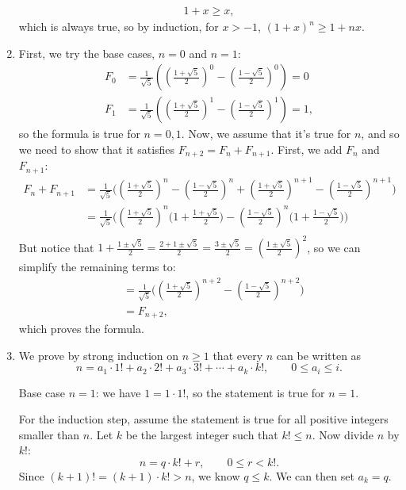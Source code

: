\documentclass[12pt]{article}
\begin{document}
\begin{enumerate}
\begin{align*}
        1+x \geq x,
    \end{align*}
    which is always true, so by induction, for $x > -1$, $(1+x)^n \geq 1 + nx$.
    \item First, we try the base cases, $n = 0$ and $n = 1$:
    \begin{align*}
        F_0 &= \frac{1}{\sqrt{5}} \left( \left( \frac{1 + \sqrt{5}}{2} \right)^0 - \left( \frac{1 - \sqrt{5}}{2} \right)^0 \right) = 0\\
        F_1 &= \frac{1}{\sqrt{5}} \left( \left( \frac{1 + \sqrt{5}}{2} \right)^1 - \left( \frac{1 - \sqrt{5}}{2} \right)^1 \right) = 1,
    \end{align*}
    so the formula is true for $n=0,1$. Now, we assume that it's true for $n$, and 
    so we need to show that it satisfies $F_{n+2} = F_n + F_{n+1}$. First, we add 
    $F_n$ and $F_{n+1}$:
    \begin{align*}
        F_n + F_{n+1}
        &= \frac{1}{\sqrt{5}}\Bigg(
        \left(\frac{1+\sqrt{5}}{2}\right)^n - \left(\frac{1-\sqrt{5}}{2}\right)^n
        + \left(\frac{1+\sqrt{5}}{2}\right)^{n+1} - \left(\frac{1-\sqrt{5}}{2}\right)^{n+1}
        \Bigg)\\
        &= \frac{1}{\sqrt{5}}\Bigg(
        \left(\frac{1+\sqrt{5}}{2}\right)^n\!\Big(1+\frac{1+\sqrt{5}}{2}\Big)
        - \left(\frac{1-\sqrt{5}}{2}\right)^n\!\Big(1+\frac{1-\sqrt{5}}{2}\Big)
        \Bigg)\\
    \end{align*}
    But notice that $1 + \frac{1 \pm \sqrt{5}}{2}
    = \frac{2 + 1 \pm \sqrt{5}}{2}
    = \frac{3 \pm \sqrt{5}}{2}
    = \left( \frac{1 \pm \sqrt{5}}{2} \right)^2$, so 
    we can simplify the remaining terms to:
    \begin{align*}
        &= \frac{1}{\sqrt{5}}\Bigg(
        \left(\frac{1+\sqrt{5}}{2}\right)^{n+2}
        - \left(\frac{1-\sqrt{5}}{2}\right)^{n+2}
        \Bigg)\\
        &= F_{n+2},
    \end{align*}
    which proves the formula.
\item We prove by strong induction on $n \ge 1$ that every $n$ can be written as
\[
n = a_1\cdot 1! + a_2\cdot 2! + a_3\cdot 3! + \cdots + a_k\cdot k!, \qquad 0 \le a_i \le i.
\]

Base case $n=1$: we have $1 = 1\cdot 1!$, so the statement is true for $n=1$.

For the induction step, assume the statement is true for all positive integers smaller than $n$.
Let $k$ be the largest integer such that $k! \le n$.  
Now divide $n$ by $k!$:
\[
n = q \cdot k! + r, \qquad 0 \le r < k!.
\]
Since $(k+1)! = (k+1)\cdot k! > n$, we know $q \le k$.  
We can then set $a_k = q$.  


\end{enumerate}
\end{document}

